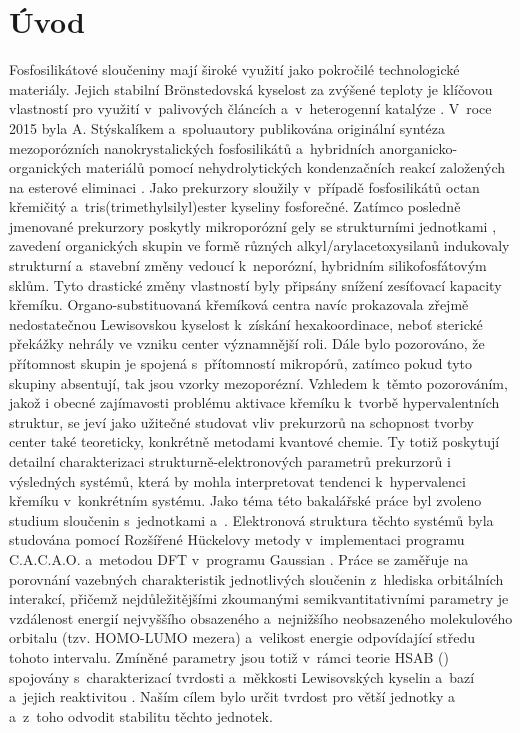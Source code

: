 \documentclass[
  printed, %
  table,   %
  lof,     %
  lot,     %
  oneside,
]{fithesis3}
\begin{document}
\chapter{Úvod}
Fosfosilikátové sloučeniny mají široké využití jako pokročilé technologické materiály. Jejich stabilní Brönstedovská kyselost za zvýšené teploty je klíčovou vlastností pro využití v~palivových článcích a~v~heterogenní katalýze \cite{korotcenkov2013handbook}\cite{Fougret2001295}. V~roce 2015 byla A. Stýskalíkem a~spoluautory publikována originální syntéza mezoporózních  nanokrystalických  fosfosilikátů a~hybridních anorganicko-organických materiálů pomocí nehydrolytických kondenzačních reakcí založených na esterové eliminaci \cite{1306716}. Jako prekurzory sloužily v~případě fosfosilikátů octan křemičitý a~tris(trimethylsilyl)ester kyseliny fosforečné. Zatímco posledně jmenované prekurzory poskytly mikroporózní gely se strukturními jednotkami , zavedení organických skupin ve formě různých alkyl/arylacetoxysilanů indukovaly strukturní  a~stavební změny vedoucí k~neporózní, hybridním silikofosfátovým sklům\cite{1316862}. Tyto drastické změny vlastností byly připsány snížení zesíťovací kapacity křemíku. Organo-substituovaná křemíková centra navíc prokazovala zřejmě nedostatečnou Lewisovskou kyselost k~získání hexakoordinace, neboť sterické překážky nehrály ve vzniku  center významnější roli.  Dále bylo pozorováno, že přítomnost skupin  je spojená s~přítomností mikropórů, zatímco pokud tyto skupiny absentují, tak jsou vzorky mezoporézní.
Vzhledem k~těmto pozorováním, jakož i obecné zajímavosti problému aktivace křemíku k~tvorbě hypervalentních struktur,\cite{rendler2005hypervalent} se jeví jako užitečné studovat vliv prekurzorů na schopnost tvorby center  také teoreticky, konkrétně metodami kvantové chemie. Ty totiž poskytují detailní charakterizaci strukturně-elektronových parametrů prekurzorů i výsledných systémů, která by mohla interpretovat tendenci k~hypervalenci křemíku v~konkrétním systému. Jako téma této bakalářské práce byl zvoleno studium sloučenin s~jednotkami  a~. Elektronová struktura těchto systémů byla studována pomocí Rozšířené Hückelovy metody v~implementaci programu C.A.C.A.O. \cite{cacao} a~metodou DFT v~programu Gaussian \cite{g09}. Práce se zaměřuje na porovnání vazebných charakteristik jednotlivých sloučenin z~hlediska orbitálních interakcí, přičemž nejdůležitějšími zkoumanými semikvantitativními parametry je  vzdálenost energií nejvyššího obsazeného a~nejnižšího neobsazeného molekulového orbitalu (tzv. HOMO-LUMO mezera) a~velikost energie odpovídající středu tohoto intervalu. Zmíněné parametry jsou totiž v~rámci teorie HSAB () spojovány s~charakterizací tvrdosti a~měkkosti Lewisovských kyselin a~bazí a~jejich reaktivitou \cite{pearson1986absolute}. Naším cílem bylo určit tvrdost pro větší jednotky  a~ a~z~toho odvodit stabilitu těchto jednotek. 
\end{document}
